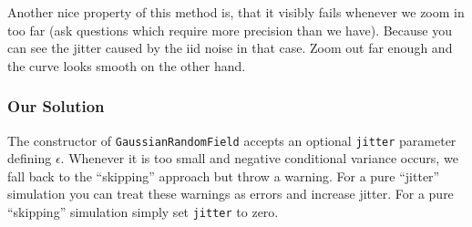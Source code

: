 Another nice property of this method is, that it visibly fails whenever we zoom
in too far (ask questions which require more precision than we have). Because
you can see the jitter caused by the iid noise in that case. Zoom out far enough
and the curve looks smooth on the other hand.

\subsubsection{Our Solution}

The constructor of \texttt{GaussianRandomField} accepts an optional 
\texttt{jitter} parameter defining \(\epsilon\). Whenever it is too
small and negative conditional variance occurs, we fall back to the ``skipping''
approach but throw a warning. For a pure ``jitter'' simulation you can treat these
warnings as errors and increase jitter. For a pure ``skipping'' simulation
simply set \texttt{jitter} to zero.

